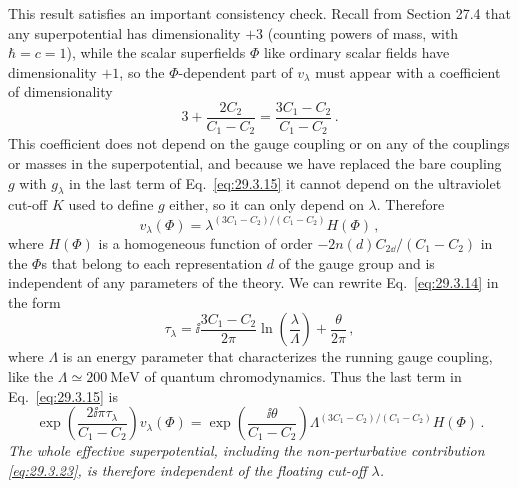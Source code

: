 This result satisfies an important consistency check. Recall from
Section 27.4 that any superpotential has dimensionality \(+3\) (counting
powers of mass, with \(\hbar=c=1\)), while the scalar superfields \(\Phi\)
like ordinary scalar fields have dimensionality \(+1\), so the
\(\Phi\)-dependent part of \(v_\lambda\) must appear with a coefficient of
dimensionality
\[
  3+\frac{2C_2}{C_1-C_2}
  =
  \frac{3C_1-C_2}{C_1-C_2}\,.
\]
This coefficient does not depend on the gauge coupling or on any of the
couplings or masses in the superpotential, and because we have replaced
the bare coupling \(g\) with \(g_\lambda\) in the last term of
Eq.~\eqref{eq:29.3.15} it cannot depend on the ultraviolet cut-off \(K\)
used to define \(g\) either, so it can only depend on \(\lambda\).
Therefore
\begin{equation}
  v_\lambda(\Phi)
  =
  \lambda^{(3C_1-C_2)/(C_1-C_2)}H(\Phi)\,,
  \tag{29.3.21}\label{eq:29.3.21}
\end{equation}
where \(H(\Phi)\) is a homogeneous function of order
\(-2n(d)C_{2\dd}/(C_1-C_2)\) in the \(\Phi\)s that belong to each
representation \(d\) of the gauge group and is independent of any
parameters of the theory. We can rewrite Eq.~\eqref{eq:29.3.14} in the
form
\begin{equation}
  \tau_\lambda
  =
  \ii\frac{3C_1-C_2}{2\pi}
  \ln\left(\frac{\lambda}{\Lambda}\right)
  +\frac{\theta}{2\pi}\,,
  \tag{29.3.22}\label{eq:29.3.22}
\end{equation}
where \(\Lambda\) is an energy parameter that characterizes the running
gauge coupling, like the \(\Lambda\simeq200\ \mathrm{MeV}\) of quantum
chromodynamics. Thus the last term in Eq.~\eqref{eq:29.3.15} is
\begin{equation}
  \exp\left(\frac{2\ii\pi\tau_\lambda}{C_1-C_2}\right)
  v_\lambda(\Phi)
  =
  \exp\left(\frac{\ii\theta}{C_1-C_2}\right)
  \Lambda^{(3C_1-C_2)/(C_1-C_2)}H(\Phi)\,.
  \tag{29.3.23}\label{eq:29.3.23}
\end{equation}
\emph{The whole effective superpotential, including the non-perturbative
contribution \eqref{eq:29.3.23}, is therefore independent of the floating
cut-off \(\lambda\).}

